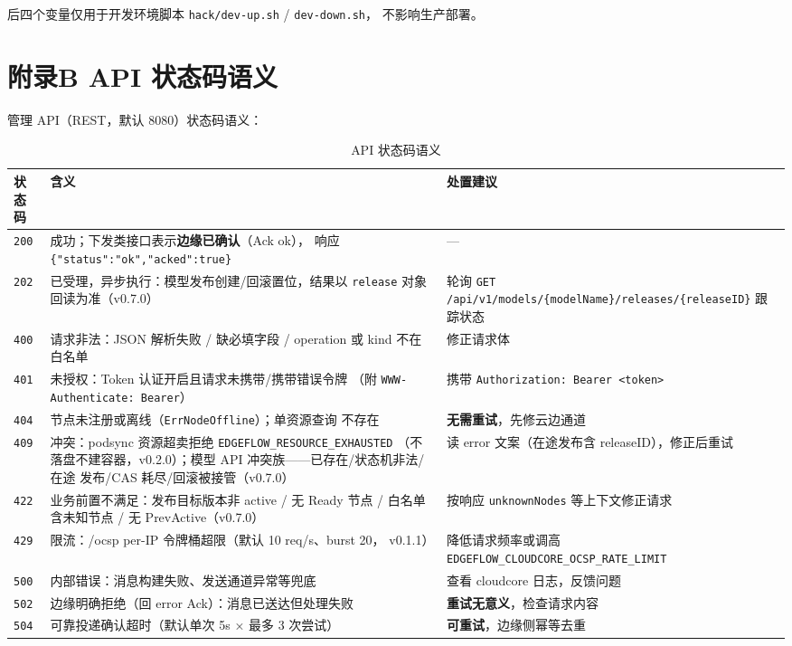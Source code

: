 后四个变量仅用于开发环境脚本 \texttt{hack/dev-up.sh} / \texttt{dev-down.sh}，
不影响生产部署。

\chapter{附录B API 状态码语义}
\label{app:B}

管理 API（REST，默认 8080）状态码语义：

\begin{table}[htbp]
\centering
\caption{API 状态码语义}
\label{tab:b-codes}
\begin{tabularx}{\textwidth}{l l X}
\toprule
\textbf{状态码} & \textbf{含义} & \textbf{处置建议} \\
\midrule
\texttt{200} & 成功；下发类接口表示\textbf{边缘已确认}（Ack ok），
响应 \texttt{\{"status":"ok","acked":true\}} & — \\
\texttt{202} & 已受理，异步执行：模型发布创建/回滚置位，结果以
\texttt{release} 对象回读为准（v0.7.0） & 轮询
\texttt{GET /api/v1/models/\{modelName\}/releases/\{releaseID\}}
跟踪状态 \\
\texttt{400} & 请求非法：JSON 解析失败 / 缺必填字段 / operation 或
kind 不在白名单 & 修正请求体 \\
\texttt{401} & 未授权：Token 认证开启且请求未携带/携带错误令牌
（附 \texttt{WWW-Authenticate: Bearer}） & 携带
\texttt{Authorization: Bearer <token>} \\
\texttt{404} & 节点未注册或离线（\texttt{ErrNodeOffline}）；单资源查询
不存在 & \textbf{无需重试}，先修云边通道 \\
\texttt{409} & 冲突：podsync 资源超卖拒绝 \texttt{EDGEFLOW\_RESOURCE\_EXHAUSTED}
（不落盘不建容器，v0.2.0）；模型 API 冲突族——已存在/状态机非法/在途
发布/CAS 耗尽/回滚被接管（v0.7.0） & 读 error 文案（在途发布含
releaseID），修正后重试 \\
\texttt{422} & 业务前置不满足：发布目标版本非 active / 无 Ready 节点 /
白名单含未知节点 / 无 PrevActive（v0.7.0） & 按响应
\texttt{unknownNodes} 等上下文修正请求 \\
\texttt{429} & 限流：/ocsp per-IP 令牌桶超限（默认 10 req/s、burst 20，
v0.1.1） & 降低请求频率或调高
\texttt{EDGEFLOW\_CLOUDCORE\_OCSP\_RATE\_LIMIT} \\
\texttt{500} & 内部错误：消息构建失败、发送通道异常等兜底 & 查看
cloudcore 日志，反馈问题 \\
\texttt{502} & 边缘明确拒绝（回 error Ack）：消息已送达但处理失败 &
\textbf{重试无意义}，检查请求内容 \\
\texttt{504} & 可靠投递确认超时（默认单次 5s × 最多 3 次尝试） &
\textbf{可重试}，边缘侧幂等去重 \\
\bottomrule
\end{tabularx}
\end{table}

